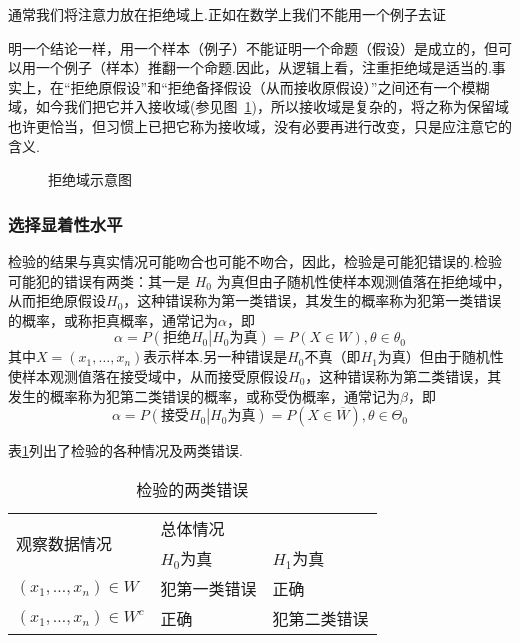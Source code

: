 通常我们将注意力放在拒绝域上.正如在数学上我们不能用一个例子去证

明一个结论一样，用一个样本（例子）不能证明一个命题（假设）是成立的，但可以用一个例子（样本）推翻一个命题.因此，从逻辑上看，注重拒绝域是适当的.事实上，在“拒绝原假设”和“拒绝备择假设（从而接收原假设）”之间还有一个模糊域，如今我们把它并入接收域(参见图~\ref{fig7.1.1})，所以接收域是复杂的，将之称为保留域也许更恰当，但习惯上已把它称为接收域，没有必要再进行改变，只是应注意它的含义.
\begin{figure}[!ht]
  \centering
  \caption{拒绝域示意图\label{fig7.1.1}}
\end{figure}


\subsubsection{选择显着性水平}

检验的结果与真实情况可能吻合也可能不吻合，因此，检验是可能犯错误的.检验可能犯的错误有两类：其一是 $H_{0}$ 为真但由子随机性使样本观测值落在拒绝域中，从而拒绝原假设$H_{0}$，这种错误称为第一类错误，其发生的概率称为犯第一类错误的概率，或称拒真概率，通常记为$\alpha$，即
\begin{equation}\label{eq7.1.1}
\alpha =P\left(\text{拒绝}H_0\left| H_0\text{为真}\right.\right)=P\left(X\in W\right),\theta\in\theta_0
\end{equation}
其中$X= \left( x _ { 1 } , \dotsc , x _ { n } \right)$表示样本.另一种错误是$H_{0}$不真（即$H_{1}$为真）但由于随机性使样本观测值落在接受域中，从而接受原假设$H_{0}$，这种错误称为第二类错误，其发生的概率称为犯第二类错误的概率，或称受伪概率，通常记为$\beta$，即
\begin{equation}\label{eq7.1.2}
\alpha =P\left(\textrm{接受}H_0\left| H_0\textrm{为真}\right.\right)=P\left(X\in \overline{ W }\right),\theta\in\Theta_0
\end{equation}

表\ref{table7.1.1}列出了检验的各种情况及两类错误.
\begin{table}[!htp]
	\centering
	\caption{检验的两类错误}\label{table7.1.1}
		\begin{tabular}{lll}
	\hline
\multirow{2}{*}{观察数据情况} & \multicolumn{2}{l}{\hspace{4em}总体情况} \\ \cline{2-3}
& $H_{0}$为真   & $H_{1}$为真     \\ \hline
$(x_{1},\dotsc,x_{n})\in W$ & 犯第一类错误 & 正确  \\
$(x_{1},\dotsc,x_{n})\in W^{c}$   & 正确  & 犯第二类错误        \\ \hline
	\end{tabular}
\end{table}

